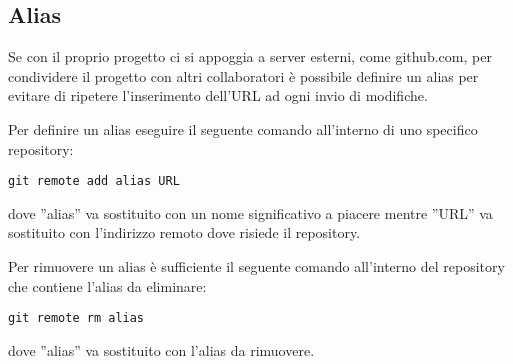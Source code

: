 \subsection{Alias}
Se con il proprio progetto ci si appoggia a server esterni, come github.com, per condividere il progetto con altri collaboratori è possibile definire un alias per evitare di ripetere l'inserimento dell'URL ad ogni invio di modifiche.

Per definire un alias eseguire il seguente comando all'interno di uno specifico repository:

\begin{center}
\texttt{git remote add alias URL}
\end{center}

dove ''alias'' va sostituito con un nome significativo a piacere mentre ''URL'' va sostituito con l'indirizzo remoto dove risiede il repository.

Per rimuovere un alias è sufficiente il seguente comando all'interno del repository che contiene l'alias da eliminare:

\begin{center}
\texttt{git remote rm alias}
\end{center}

dove ''alias'' va sostituito con l'alias da rimuovere.